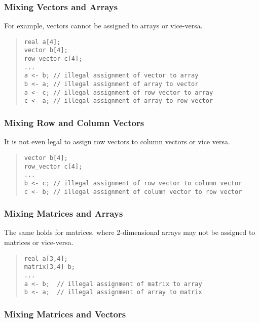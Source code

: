 \subsubsection{Mixing Vectors and Arrays}

For example, vectors cannot be assigned to arrays or vice-versa.
%
\begin{quote}
\begin{Verbatim}
real a[4];
vector b[4];
row_vector c[4];
...
a <- b; // illegal assignment of vector to array
b <- a; // illegal assignment of array to vector
a <- c; // illegal assignment of row vector to array
c <- a; // illegal assignment of array to row vector
\end{Verbatim}
\end{quote}

\subsubsection{Mixing Row and Column Vectors}

It is not even legal to assign row vectors to column vectors or vice
versa.  
\begin{quote}
\begin{Verbatim}
vector b[4];
row_vector c[4];
...
b <- c; // illegal assignment of row vector to column vector
c <- b; // illegal assignment of column vector to row vector
\end{Verbatim}
\end{quote}
%

\subsubsection{Mixing Matrices and Arrays}

The same holds for matrices, where 2-dimensional arrays may not be
assigned to matrices or vice-versa.

\begin{quote}
\begin{Verbatim}
real a[3,4];
matrix[3,4] b;
...
a <- b;  // illegal assignment of matrix to array
b <- a;  // illegal assignment of array to matrix
\end{Verbatim}
\end{quote}
%

\subsubsection{Mixing Matrices and Vectors}

